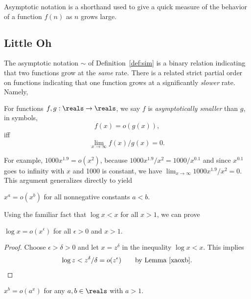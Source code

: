 \label{asymptotic_sec}

Asymptotic notation is a shorthand used to give a quick measure of the
behavior of a function $f(n)$ as $n$ grows large.

\subsection{Little Oh}

The asymptotic notation $\sim$ of Definition~\ref{def:sim} is a binary
relation indicating that two functions grow at the \emph{same} rate.
There is a related strict partial order on functions indicating that one
function grows at a significantly \emph{slower} rate.  Namely,
\begin{definition}
For functions $f,g: \reals \to \reals$, we say $f$ is \emph{asymptotically
smaller} than $g$, in symbols,
\[
f(x) = o(g(x)),
\]
iff
\[
\lim_{x \rightarrow \infty} f(x)/g(x) = 0.
\]
\end{definition}

For example, $1000x^{1.9} = o(x^2)$, because $1000x^{1.9}/x^2 =
1000/x^{0.1}$ and since $x^{0.1}$ goes to infinity with $x$ and 1000 is
constant, we have $\lim_{x \rightarrow \infty} 1000x^{1.9}/x^2 = 0$.
This argument generalizes directly to yield
\begin{lemma}\label{xaoxb}
$x^a = o(x^b)$ for all nonnegative constants $a<b$.
\end{lemma}

Using the familiar fact that  $\log x < x$ for all $x >1$, we can prove
\begin{lemma}\label{logxxe}
$\log x = o(x^{\epsilon})$ for all $\epsilon >0$ and $x > 1$.
\end{lemma}

\begin{proof}
Choose $\epsilon > \delta > 0$ and let $x = z^\delta$ in the inequality
$\log x < x$.  This implies
\begin{equation}\label{zdd}
\log z  <  z^{\delta}/\delta
 =  o(z^{\epsilon})\qquad \text{by Lemma~\ref{xaoxb}}.
\end{equation}
\end{proof}

\begin{corollary}\label{xbax}
$x^b = o(a^x)$ for any $a,b \in \reals$ with $a>1$.
\end{corollary}

